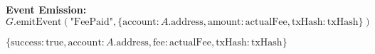 \begin{protocol}
\begin{algorithmic}[1]
\State \textbf{Event Emission:}
\State $G.\text{emitEvent}(\text{"FeePaid"}, \{\text{account}: A.\text{address}, \text{amount}: \text{actualFee}, \text{txHash}: \text{txHash}\})$

\State \Return $\{\text{success}: \text{true}, \text{account}: A.\text{address}, \text{fee}: \text{actualFee}, \text{txHash}: \text{txHash}\}$
\end{algorithmic}
\end{protocol}
